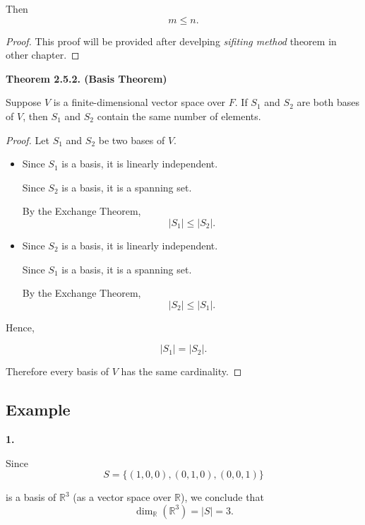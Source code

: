 \documentclass[12pt]{article}
\begin{document}
Then
\[
m\le n.
\]

\begin{proof}
    This proof will be provided after develping \emph{sifiting method} theorem in\\
    other chapter.
\end{proof}

\textbf{Theorem 2.5.2. (Basis Theorem)}

Suppose $V$ is a finite-dimensional vector space over $F$.
If $S_1$ and $S_2$ are both bases of $V$, then $S_1$ and $S_2$
contain the same number of elements.

\begin{proof}
Let $S_1$ and $S_2$ be two bases of $V$.

\begin{itemize}
    \item Since $S_1$ is a basis, it is linearly independent.
    
    Since $S_2$ is a basis, it is a spanning set.
    
    By the Exchange Theorem,
    \[
    |S_1|\le |S_2|.
    \]

    \item Since $S_2$ is a basis, it is linearly independent.

    Since $S_1$ is a basis, it is a spanning set.
    
    By the Exchange Theorem,
    \[
    |S_2|\le |S_1|.
    \]

\end{itemize}

Hence,

\[
|S_1|=|S_2|.
\]

Therefore every basis of $V$ has the same cardinality.
\end{proof}

\subsection{Example}

\textbf{1.}

\bigskip

Since
\[
S=\{(1,0,0),(0,1,0),(0,0,1)\}
\]

is a basis of $\mathbb{R}^3$ (as a vector space over $\mathbb{R}$), we conclude that
\[
\dim_{\mathbb{R}}(\mathbb{R}^3)
=
|S|
=
3.
\]
\end{document}
